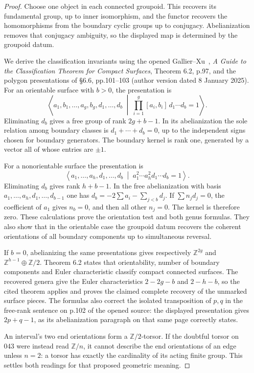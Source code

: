 \begin{proof}
Choose one object in each connected groupoid. This recovers its
fundamental group, up to inner isomorphism, and the functor recovers
the homomorphisms from the boundary cyclic groups up to conjugacy.
Abelianization removes that conjugacy ambiguity, so the displayed
map is determined by the groupoid datum.

We derive the classification invariants using the opened
Gallier--Xu~\cite{GallierXu2025}, \emph{A Guide to the Classification Theorem for
Compact Surfaces}, Theorem 6.2, p.97, and the polygon presentations
of \S6.6, pp.101--103 (author version dated 8 January 2025).
For an orientable surface with $b>0$, the presentation is
\[
 \left\langle a_1,b_1,\ldots,a_g,b_g,d_1,\ldots,d_b
 \;\middle|\;\prod_{i=1}^g[a_i,b_i]\,d_1\cdots d_b=1\right\rangle.
\]
Eliminating $d_b$ gives a free group of rank $2g+b-1$.
In its abelianization the sole relation among boundary classes
is $d_1+\cdots+d_b=0$, up to the independent signs chosen for
boundary generators. The boundary kernel is rank one, generated
by a vector all of whose entries are $\pm1$.

For a nonorientable surface the presentation is
\[
 \left\langle a_1,\ldots,a_h,d_1,\ldots,d_b
 \;\middle|\;a_1^2\cdots a_h^2d_1\cdots d_b=1\right\rangle.
\]
Eliminating $d_b$ gives rank $h+b-1$. In the free abelianization
with basis $a_1,\ldots,a_h,d_1,\ldots,d_{b-1}$ one has
$d_b=-2\sum a_i-\sum_{j<b}d_j$. If $\sum n_jd_j=0$, the
coefficient of $a_1$ gives $n_b=0$, and then all other $n_j=0$.
The kernel is therefore zero. These calculations prove the
orientation test and both genus formulas. They also show that
in the orientable case the groupoid datum recovers the coherent
orientations of all boundary components up to simultaneous reversal.

If $b=0$, abelianizing the same presentations gives respectively
$\mathbb Z^{2g}$ and $\mathbb Z^{h-1}\oplus\mathbb Z/2$.
Theorem 6.2 states that orientability, number of boundary components
and Euler characteristic classify compact connected surfaces.
The recovered genera give the Euler characteristics
$2-2g-b$ and $2-h-b$, so the cited theorem applies and proves
the claimed complete recovery of the unmarked surface pieces.
The formulas also correct the isolated transposition of $p,q$
in the free-rank sentence on p.102 of the opened source:
the displayed presentation gives $2p+q-1$, as its abelianization
paragraph on that same page correctly states.

An interval's two end orientations form a $\mathbb Z/2$-torsor.
If the doubtful torsor on 043 were instead read $\mathbb Z/n$,
it cannot describe the end orientations of an edge unless $n=2$:
a torsor has exactly the cardinality of its acting finite group.
This settles both readings for that proposed geometric meaning.
\end{proof}

